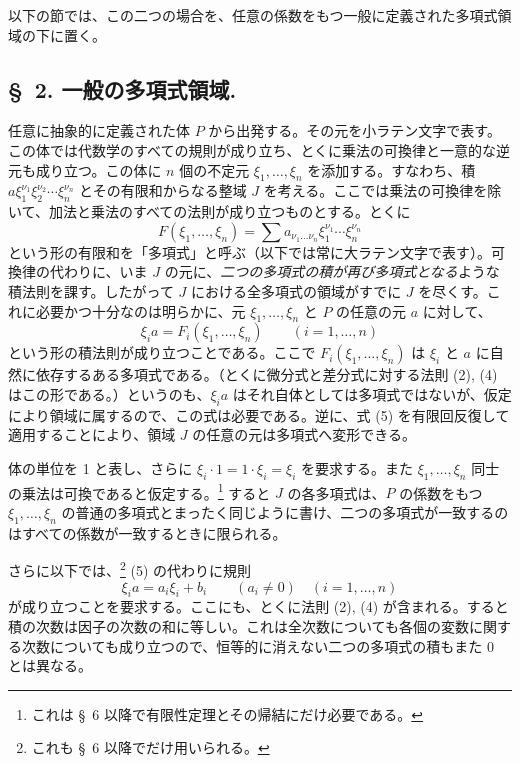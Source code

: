 \documentclass[11pt]{article}
\begin{document}
以下の節では、この二つの場合を、任意の係数をもつ一般に定義された多項式領域の下に置く。

\subsection*{\S~2. 一般の多項式領域.}

任意に抽象的に定義された体 $P$ から出発する。その元を小ラテン文字で表す。この体では代数学のすべての規則が成り立ち、とくに乗法の可換律と一意的な逆元も成り立つ。この体に $n$ 個の不定元 $\xi_1,\ldots,\xi_n$ を添加する。すなわち、積 $a\xi_1^{\nu_1}\xi_2^{\nu_2}\cdots\xi_n^{\nu_n}$ とその有限和からなる整域 $J$ を考える。ここでは乗法の可換律を除いて、加法と乗法のすべての法則が成り立つものとする。とくに
\[
 F(\xi_1,\ldots,\xi_n)=\sum a_{\nu_1\ldots\nu_n}\xi_1^{\nu_1}\cdots\xi_n^{\nu_n}
\]
という形の有限和を「多項式」と呼ぶ（以下では常に大ラテン文字で表す）。可換律の代わりに、いま $J$ の元に、\emph{二つの多項式の積が再び多項式となる}ような積法則を課す。したがって $J$ における全多項式の領域がすでに $J$ を尽くす。これに必要かつ十分なのは明らかに、元 $\xi_1,
\ldots,\xi_n$ と $P$ の任意の元 $a$ に対して、
\begin{equation}
 \xi_i a=F_i(\xi_1,\ldots,\xi_n)\qquad (i=1,\ldots,n)
\tag{5}
\end{equation}
という形の積法則が成り立つことである。ここで $F_i(\xi_1,\ldots,\xi_n)$ は $\xi_i$ と $a$ に自然に依存するある多項式である。（とくに微分式と差分式に対する法則 (2), (4) はこの形である。）というのも、$\xi_i a$ はそれ自体としては多項式ではないが、仮定により領域に属するので、この式は必要である。逆に、式 (5) を有限回反復して適用することにより、領域 $J$ の任意の元は多項式へ変形できる。

体の単位を 1 と表し、さらに $\xi_i\cdot1=1\cdot\xi_i=\xi_i$ を要求する。また $\xi_1,\ldots,\xi_n$ 同士の乗法は可換であると仮定する。\footnote{これは \S~6 以降で有限性定理とその帰結にだけ必要である。} すると $J$ の各多項式は、$P$ の係数をもつ $\xi_1,\ldots,\xi_n$ の普通の多項式とまったく同じように書け、二つの多項式が一致するのはすべての係数が一致するときに限られる。

さらに以下では、\footnote{これも \S~6 以降でだけ用いられる。} (5) の代わりに規則
\begin{equation}
 \xi_i a=a_i\xi_i+b_i\qquad (a_i\ne0)\quad(i=1,\ldots,n)
\tag{6}
\end{equation}
が成り立つことを要求する。ここにも、とくに法則 (2), (4) が含まれる。すると積の次数は因子の次数の和に等しい。これは全次数についても各個の変数に関する次数についても成り立つので、恒等的に消えない二つの多項式の積もまた 0 とは異なる。
\end{document}
